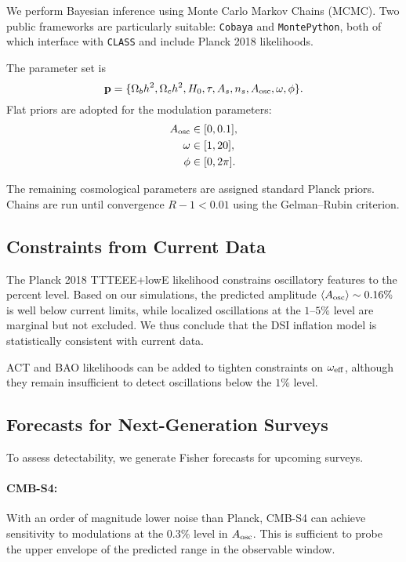 \documentclass[reprint, amsmath, amssymb, aps, prd, nofootinbib]{revtex4-2}
\begin{document}
We perform Bayesian inference using Monte Carlo Markov Chains (MCMC).
Two public frameworks are particularly suitable:
\texttt{Cobaya} and \texttt{MontePython}, both of which interface with
\texttt{CLASS} and include Planck 2018 likelihoods.

The parameter set is
\begin{equation}
\mathbf{p} = \{ \Omega_b h^2, \Omega_c h^2, H_0, \tau, A_s, n_s,
A_{\rm osc}, \omega, \phi \}.
\end{equation}
Flat priors are adopted for the modulation parameters:
\begin{align}
A_{\rm osc} &\in [0,0.1], \\
\omega &\in [1,20], \\
\phi &\in [0,2\pi].
\end{align}

The remaining cosmological parameters are assigned standard Planck priors.
Chains are run until convergence $R-1<0.01$ using the Gelman–Rubin criterion.

\subsection{Constraints from Current Data}

The Planck 2018 TTTEEE+lowE likelihood constrains oscillatory features to
the percent level. Based on our simulations, the predicted amplitude
$\langle A_{\rm osc}\rangle \sim 0.16\%$ is well below current limits, while
localized oscillations at the $1$--$5\%$ level are marginal but not excluded.
We thus conclude that the DSI inflation model is statistically consistent
with current data.

ACT and BAO likelihoods can be added to tighten constraints on $\omega_{\rm eff}$,
although they remain insufficient to detect oscillations below the $1\%$ level.

\subsection{Forecasts for Next-Generation Surveys}

To assess detectability, we generate Fisher forecasts for upcoming surveys.

\paragraph{CMB-S4:} With an order of magnitude lower noise than Planck,
CMB-S4 can achieve sensitivity to modulations at the $0.3\%$ level in $A_{\rm osc}$.
This is sufficient to probe the upper envelope of the predicted range in the
observable window.
\end{document}
